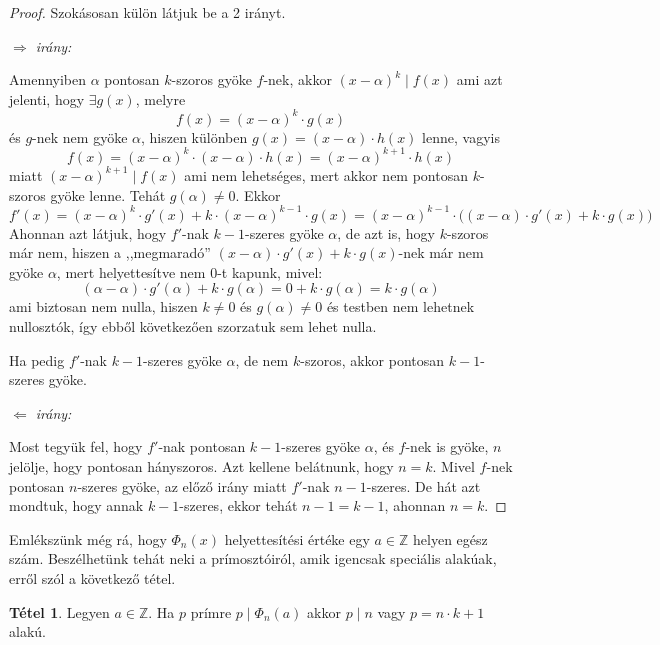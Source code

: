 \documentclass[12pt]{book}
\theoremstyle{plain} %
\theoremstyle{definition} %
\newtheorem{theo/}{Tétel}[section]
\newenvironment{theo}
  {\renewcommand{\qedsymbol}{$\clubsuit$}%
   \pushQED{\qed}\begin{theo/}}
  {\popQED\end{theo/}}
\theoremstyle{remark}
\renewcommand\qedsymbol{$\blacksquare$}
\numberwithin{equation}{section}  %
\def\Z{\mathbb{Z}}
\begin{document}
	\begin{proof}
		Szokásosan külön látjuk be a 2 irányt.
		
		\textit{$\Rightarrow$ irány:}
		
		Amennyiben $\alpha$ pontosan $k$-szoros gyöke $f$-nek, akkor $(x-\alpha)^k\mid f(x)$ ami azt jelenti, hogy $\exists g(x)$, melyre
		\[  f(x) = (x-\alpha)^k \cdot g(x)  \]
		és $g$-nek nem gyöke $\alpha$, hiszen különben $g(x) = (x-\alpha)\cdot h(x)$ lenne, vagyis
		\[ f(x) = (x-\alpha)^k \cdot (x-\alpha)\cdot h(x) = (x-\alpha)^{k+1} \cdot h(x) \]
		miatt $(x-\alpha)^{k+1} \mid f(x)$ ami nem lehetséges, mert akkor nem pontosan $k$-szoros gyöke lenne. Tehát $g(\alpha)\neq 0$. Ekkor
		\[ f'(x) = (x-\alpha)^k \cdot g'(x) + k\cdot (x-\alpha)^{k-1} \cdot g(x) = (x-\alpha)^{k-1} \cdot \Big( (x-\alpha) \cdot g'(x) + k \cdot g(x) \Big) \]
		Ahonnan azt látjuk, hogy $f'$-nak $k-1$-szeres gyöke $\alpha$, de azt is, hogy $k$-szoros már nem, hiszen a ,,megmaradó'' $(x-\alpha) \cdot g'(x) + k\cdot g(x)$-nek már nem gyöke $\alpha$, mert helyettesítve nem $0$-t kapunk, mivel:
		\[ (\alpha-\alpha)\cdot g'(\alpha) + k\cdot g(\alpha) = 0 + k\cdot g(\alpha) = k\cdot g(\alpha)  \]
		ami biztosan nem nulla, hiszen $k\neq 0$ és $g(\alpha)\neq 0$ és testben nem lehetnek nullosztók, így ebből következően szorzatuk sem lehet nulla.
		
		Ha pedig $f'$-nak $k-1$-szeres gyöke $\alpha$, de nem $k$-szoros, akkor pontosan $k-1$-szeres gyöke.
		
		\textit{$\Leftarrow$ irány:}
		
		Most tegyük fel, hogy $f'$-nak pontosan $k-1$-szeres gyöke $\alpha$, és $f$-nek is gyöke, $n$ jelölje, hogy pontosan hányszoros. Azt kellene belátnunk, hogy $n=k$. Mivel $f$-nek pontosan $n$-szeres gyöke, az előző irány miatt $f'$-nak $n-1$-szeres. De hát azt mondtuk, hogy annak $k-1$-szeres, ekkor tehát $n-1 = k-1$, ahonnan $n=k$.
	\end{proof}

	Emlékszünk még rá, hogy $\Phi_n(x)$ helyettesítési értéke egy $a\in \Z$ helyen egész szám. Beszélhetünk tehát neki a prímosztóiról, amik igencsak speciális alakúak, erről szól a következő tétel.
	
	\begin{theo}\label{nk+1}
		Legyen $a\in \Z$. Ha $p$ prímre $p \mid \Phi_n(a)$ akkor $p\mid n$ vagy $p = n\cdot k + 1$ alakú.
	\end{theo}
\end{document}
